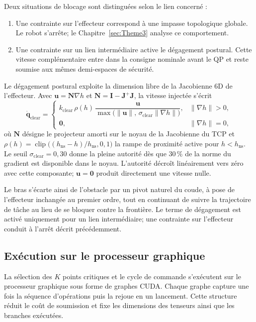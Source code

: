 Deux situations de blocage sont distinguées selon le lien concerné :
\begin{enumerate}
    \item Une contrainte sur l'effecteur correspond à une impasse topologique globale. Le robot s'arrête; le Chapitre~\ref{sec:Theme3} analyse ce comportement.
    \item Une contrainte sur un lien intermédiaire active le dégagement postural. Cette vitesse complémentaire entre dans la consigne nominale avant le QP et reste soumise aux mêmes demi-espaces de sécurité.
\end{enumerate}

Le dégagement postural exploite la dimension libre de la Jacobienne 6D de l'effecteur. Avec $\mathbf{u}=\mathbf{N}\nabla h$ et $\mathbf{N}=\mathbf{I}-\mathbf{J}^{+}\mathbf{J}$, la vitesse injectée s'écrit
\begin{equation}
\dot{\mathbf{q}}_{\mathrm{clear}}
=
\begin{cases}
k_{\mathrm{clear}}\,\rho(h)\,
\dfrac{\mathbf{u}}{\max\!\bigl(\|\mathbf{u}\|,\,\sigma_{\mathrm{clear}}\|\nabla h\|\bigr)},
& \|\nabla h\|>0,\\[6pt]
\mathbf{0}, & \|\nabla h\|=0,
\end{cases}
\end{equation}
où $\mathbf{N}$ désigne le projecteur amorti sur le noyau de la Jacobienne du \ac{TCP} et $\rho(h)=\operatorname{clip}\!\big((h_{\mathrm{ns}}-h)/h_{\mathrm{ns}},0,1\big)$ la rampe de proximité active pour $h<h_{\mathrm{ns}}$. Le seuil $\sigma_{\mathrm{clear}}=0{,}30$ donne la pleine autorité dès que $30\,\%$ de la norme du gradient est disponible dans le noyau. L'autorité décroît linéairement vers zéro avec cette composante; $\mathbf{u}=\mathbf{0}$ produit directement une vitesse nulle.

Le bras s'écarte ainsi de l'obstacle par un pivot naturel du coude, à pose de l'effecteur inchangée au premier ordre, tout en continuant de suivre la trajectoire de tâche au lieu de se bloquer contre la frontière. Le terme de dégagement est activé uniquement pour un lien intermédiaire; une contrainte sur l'effecteur conduit à l'arrêt décrit précédemment.

\subsection{Exécution sur le processeur graphique}\label{subsec:graphes_cuda}
La sélection des $K$ points critiques et le cycle de commande s'exécutent sur le processeur graphique sous forme de graphes \ac{CUDA}. Chaque graphe capture une fois la séquence d'opérations puis la rejoue en un lancement. Cette structure réduit le coût de soumission et fixe les dimensions des tenseurs ainsi que les branches exécutées.

